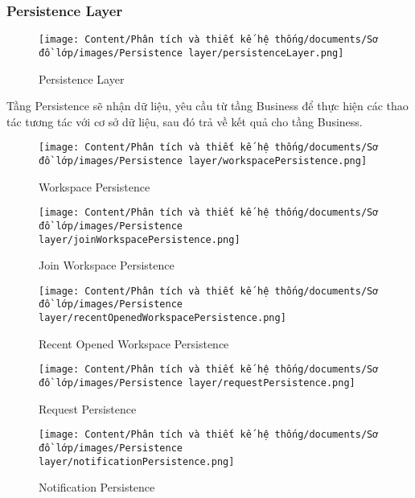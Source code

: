 \subsubsection{Persistence Layer}

\begin{figure}[H]
    \centering
    \texttt{[image: Content/Phân tích và thiết kế hệ thống/documents/Sơ đồ lớp/images/Persistence layer/persistenceLayer.png]}
    \vspace{0.5cm}
    \caption{Persistence Layer}
    \label{fig:Persistence Layer}
\end{figure}
Tầng Persistence sẽ nhận dữ liệu, yêu cầu từ tầng Business để thực hiện các thao tác tương tác với cơ sở dữ liệu, sau đó trả về kết quả cho tầng Business.

\begin{figure}[H]
    \centering
    \texttt{[image: Content/Phân tích và thiết kế hệ thống/documents/Sơ đồ lớp/images/Persistence layer/workspacePersistence.png]}
    \vspace{0.5cm}
    \caption{Workspace Persistence}
    \label{fig:Workspace Persistence}
\end{figure}

\begin{figure}[H]
    \centering
    \texttt{[image: Content/Phân tích và thiết kế hệ thống/documents/Sơ đồ lớp/images/Persistence layer/joinWorkspacePersistence.png]}
    \vspace{0.5cm}
    \caption{Join Workspace Persistence}
    \label{fig:Join Workspace Persistence}
\end{figure}

\begin{figure}[H]
    \centering
    \texttt{[image: Content/Phân tích và thiết kế hệ thống/documents/Sơ đồ lớp/images/Persistence layer/recentOpenedWorkspacePersistence.png]}
    \vspace{0.5cm}
    \caption{Recent Opened Workspace Persistence}
    \label{fig:Recent Opened Workspace Persistence}
\end{figure}

\begin{figure}[H]
    \centering
    \texttt{[image: Content/Phân tích và thiết kế hệ thống/documents/Sơ đồ lớp/images/Persistence layer/requestPersistence.png]}
    \vspace{0.5cm}
    \caption{Request Persistence}
    \label{fig:Request Persistence}
\end{figure}

\begin{figure}[H]
    \centering
    \texttt{[image: Content/Phân tích và thiết kế hệ thống/documents/Sơ đồ lớp/images/Persistence layer/notificationPersistence.png]}
    \vspace{0.5cm}
    \caption{Notification Persistence}
    \label{fig:Notification Persistence}
\end{figure}
